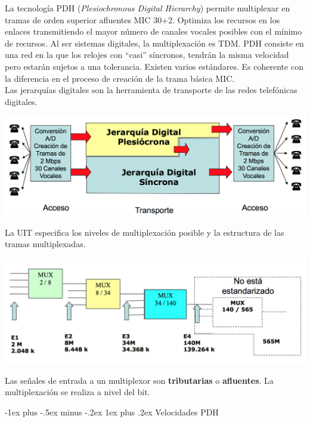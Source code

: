 \documentclass[10pt,portrait, twocolumn]{article}
\makeatletter
\renewcommand{\subsubsection}{\@startsection{subsubsection}{3}{0mm}%
                                {-1ex plus -.5ex minus -.2ex}%
                                {1ex plus .2ex}%
                                {\normalfont\small\bfseries}}
\makeatother
\begin{document}
La tecnología PDH (\textit{Plesiochronous Digital Hierarchy}) permite multiplexar en tramas de orden superior afluentes MIC 30+2. Optimiza los recursos en los enlaces transmitiendo el mayor número de canales vocales posibles con el mínimo de recursos. Al ser sistemas digitales, la multiplexación es TDM. PDH consiste en una red en la que los relojes con ``casi'' síncronos, tendrán la misma velocidad pero estarán sujetos a una tolerancia. Existen varios estándares. Es coherente con la diferencia en el proceso de creación de la trama básica MIC.\\

Las jerarquías digitales son la herramienta de transporte de las redes telefónicas digitales.

	\begin{center}
		\includegraphics[scale=0.2]{images/Jerarquia}
	\end{center}
	
La UIT especifica los niveles de multiplexación posible y la estructura de las tramas multiplexadas.

	\begin{center}
		\includegraphics[scale=0.2]{images/NivelesMUX}
	\end{center}

Las señales de entrada a un multiplexor son \textbf{tributarias} o \textbf{afluentes}. La multiplexación se realiza a nivel del bit.

\subsubsection{Velocidades PDH}
\end{document}
